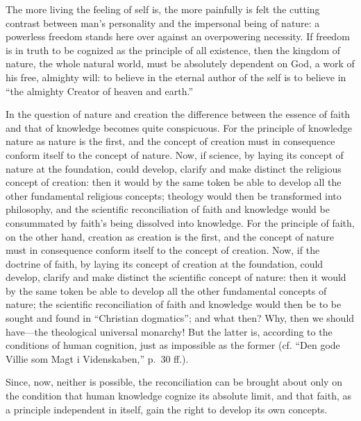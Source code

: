 \documentclass[12pt]{book}
\newcommand{\opage}[1]{\marginnote{\footnotesize\textit{[#1]}}}
\begin{document}
The more living the feeling of self is, the more painfully is felt the
cutting contrast between man's personality and the impersonal being of
nature: a powerless freedom stands here over against an overpowering
necessity. If freedom is in truth to be cognized as the principle of
all existence, then the kingdom of nature, the whole natural world, must
be absolutely dependent on God, a work of his free, almighty will: to
believe in the eternal author of the self is to believe in ``the almighty
Creator of heaven and earth.''

In the question of nature and creation the difference between the
essence of faith and that of knowledge becomes quite conspicuous. For
the principle of knowledge nature as nature is the first, and the
concept of creation must in consequence conform itself to the concept of
nature. Now, if science, by laying its concept of nature at the
foundation, could develop, clarify and make distinct the religious
concept of creation: then it would by the same token be able to develop
all the other fundamental religious concepts; theology would then be
transformed into philosophy, and the scientific reconciliation of faith
and knowledge would be consummated by faith's being dissolved into
knowledge. For the principle of faith, on the other hand, creation as
creation is the first, and the concept of nature must in consequence
conform itself to the concept of creation. Now, if the doctrine of faith,
by laying its concept of creation at the foundation, could develop,
clarify and make distinct the scientific concept of nature: then it
would by the same token be able to develop all the other fundamental
concepts of nature; the scientific reconciliation of faith and knowledge
would then be to be sought and found in ``Christian dogmatics''; and
what then?
\opage{143}\setcounter{footnote}{0}%
Why, then we should have---the theological universal monarchy! But the
latter is, according to the conditions of human cognition, just as
impossible as the former (cf. ``Den gode Villie som Magt i
Videnskaben,'' p.~30 ff.).

Since, now, neither is possible, the reconciliation can be brought about
only on the condition that human knowledge cognize its absolute limit,
and that faith, as a principle independent in itself, gain the right to
develop its own concepts.
\end{document}
